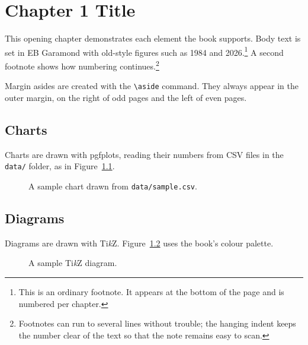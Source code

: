 \chapter{Chapter 1 Title}
\label{ch:01}

This opening chapter demonstrates each element the book supports.
Body text is set in EB Garamond with old-style figures such as 1984 and
2026.\footnote{This is an ordinary footnote. It appears at the bottom of
the page and is numbered per chapter.} A second footnote shows how
numbering continues.\footnote{Footnotes can run to several lines without
trouble; the hanging indent keeps the number clear of the text so that
the note remains easy to scan.}

Margin asides are created with the \verb|\aside| command. They always
appear in the outer margin, on the right of odd pages and the left of
even pages.

\section{Charts}

Charts are drawn with \textsf{pgfplots}, reading their numbers from CSV
files in the \texttt{data/} folder, as in Figure~\ref{fig:sample-chart}.

\begin{figure}[htbp]
  \centering
  
  \caption{A sample chart drawn from \texttt{data/sample.csv}.}
  \label{fig:sample-chart}
\end{figure}

\section{Diagrams}

Diagrams are drawn with Ti\emph{k}Z. Figure~\ref{fig:sample-diagram}
uses the book's colour palette.

\begin{figure}[htbp]
  \centering
  
  \caption{A sample Ti\emph{k}Z diagram.}
  \label{fig:sample-diagram}
\end{figure}

